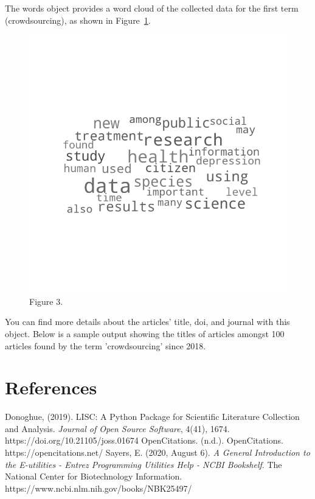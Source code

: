 \documentclass{article}
\begin{document}
The words object provides a word cloud of the collected data for the first term (crowdsourcing), as shown in Figure~\ref{fig:3}.
\begin{figure}
  \includegraphics[width=\linewidth]{output3.png}
  \caption{Figure 3.}
  \label{fig:3}
\end{figure}

You can find more details about the articles' title, doi, and journal with this object.  Below is a sample output showing the titles of articles amongst 100 articles found by the term 'crowdsourcing' since 2018.


\section{References}
 Donoghue, (2019). LISC: A Python Package for Scientific Literature Collection and Analysis. \emph{Journal of Open Source Software}, 4(41), 1674.
https://doi.org/10.21105/joss.01674
\newline
\newline
OpenCitations. (n.d.). OpenCitations. https://opencitations.net/
\newline
\newline
Sayers, E. (2020, August 6). \emph{A General Introduction to the E-utilities - Entrez Programming Utilities Help - NCBI Bookshelf}. The National Center for Biotechnology Information. https://www.ncbi.nlm.nih.gov/books/NBK25497/
\end{document}
